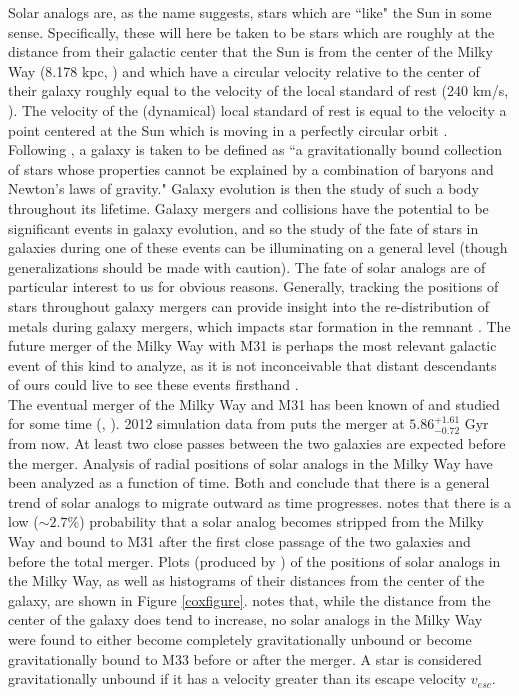 \documentclass{aastex63}
\begin{document}
Solar analogs are, as the name suggests, stars which are ``like" the Sun in some sense. Specifically, these will here be taken to be stars which are roughly at the distance from their galactic center that the Sun is from the center of the Milky Way (8.178 kpc, \cite{abuter19}) and which have a circular velocity relative to the center of their galaxy roughly equal to the velocity of the local standard of rest (240 km/s, \cite{reid14}). The velocity of the (dynamical) local standard of rest is equal to the velocity a point centered at the Sun which is moving in a perfectly circular orbit \citep{carroll96}. \\ 
\indent Following \cite{willman12}, a galaxy is taken to be defined as ``a gravitationally bound collection of stars whose properties cannot be explained by a combination of baryons and Newton's laws of gravity." Galaxy evolution is then the study of such a body throughout its lifetime. Galaxy mergers and collisions have the potential to be significant events in galaxy evolution, and so the study of the fate of stars in galaxies during one of these events can be illuminating on a general level (though generalizations should be made with caution). The fate of solar analogs are of particular interest to us for obvious reasons. Generally, tracking the positions of stars throughout galaxy mergers can provide insight into the re-distribution of metals during galaxy mergers, which impacts star formation in the remnant \citep{torrey12}. The future merger of the Milky Way with M31 is perhaps the most relevant galactic event of this kind to analyze, as it is not inconceivable that distant descendants of ours could live to see these events firsthand \citep{cox08}. \\
\indent The eventual merger of the Milky Way and M31 has been known of and studied for some time (\cite{dub06}, \cite{cox08}). 2012 simulation data from \cite{van12} puts the merger at $5.86^{+1.61}_{-0.72}$ Gyr from now. At least two close passes between the two galaxies are expected before the merger. Analysis of radial positions of solar analogs in the Milky Way have been analyzed as a function of time. Both \cite{van12} and \cite{cox08} conclude that there is a general trend of solar analogs to migrate outward as time progresses. \cite{cox08} notes that there is a low ($\sim 2.7 \%$) probability that a solar analog becomes stripped from the Milky Way and bound to M31 after the first close passage of the two galaxies and before the total merger. Plots (produced by \cite{cox08}) of the positions of solar analogs in the Milky Way, as well as histograms of their distances from the center of the galaxy, are shown in Figure \ref{coxfigure}. \cite{van12} notes that, while the distance from the center of the galaxy does tend to increase, no solar analogs in the Milky Way were found to either become completely gravitationally unbound or become gravitationally bound to M33 before or after the merger. A star is considered gravitationally unbound if it has a velocity greater than its escape velocity $v_{esc}$. 
\end{document}
